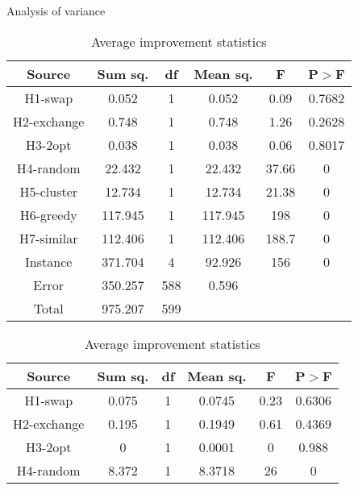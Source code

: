 \documentclass[../main.tex]{subfiles}
\begin{document}
\begin{table}
    \centering
    \caption{Analysis of variance}
    \begin{adjustbox}{width=\columnwidth,center}
        \begin{subtable}{.75\columnwidth}
            \centering
            \begin{tabular}{cccccc}
            \hline
            Source  &Sum sq.    &df &Mean sq.   &F      &P$>$F \\ 
            \hline
            H1-swap      & 0.052     & 1 & 0.052     & 0.09  & 0.7682\\
            H2-exchange      & 0.748     & 1 & 0.748     & 1.26  & 0.2628\\
            H3-2opt      & 0.038     & 1 & 0.038     & 0.06  & 0.8017\\
            H4-random      & 22.432    & 1 & 22.432    & 37.66 & 0     \\
            H5-cluster      & 12.734    & 1 & 12.734    & 21.38 & 0     \\
            H6-greedy      & 117.945   & 1 & 117.945   & 198   & 0     \\
            H7-similar      & 112.406   & 1 & 112.406   & 188.7 & 0     \\
            Instance& 371.704   & 4 & 92.926    & 156   & 0     \\
            Error   & 350.257   &588& 0.596     &       &       \\
            Total   & 975.207   &599&           &       &       \\
            \hline
            \end{tabular}
        \caption{Average improvement statistics}
        \label{tab:anovaAvrgNormal}
        \end{subtable}
        \hfill
        \begin{subtable}{.75\columnwidth}
            \centering
            \begin{tabular}{cccccc}
            \hline
            Source  &Sum sq.    &df &Mean sq.   &F      &P$>$F \\ 
            \hline
            H1-swap      & 0.075     & 1 & 0.0745    & 0.23  & 0.6306\\
            H2-exchange      & 0.195     & 1 & 0.1949    & 0.61  & 0.4369\\
            H3-2opt      & 0         & 1 & 0.0001    & 0     & 0.988 \\
            H4-random      & 8.372     & 1 & 8.3718    & 26    & 0     \\

\end{tabular}
\end{subtable}
\end{adjustbox}
\end{table}
\end{document}
